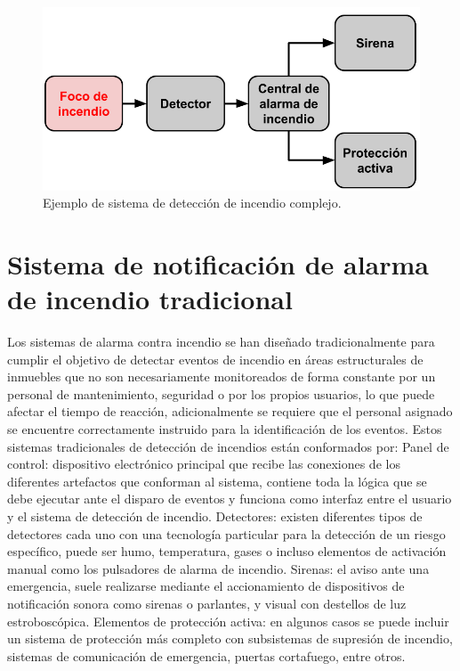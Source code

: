 \begin{figure}[h]
	\centering
	\includegraphics[scale=.4]{./Figures/Capitulo1/FIG_A1.png}
	\caption{Ejemplo de sistema de detección de incendio complejo.}
	\label{fig:figura_a1}
\end{figure}

\section{Sistema de notificación de alarma de incendio tradicional}

Los sistemas de alarma contra incendio se han diseñado tradicionalmente para cumplir el objetivo de detectar eventos de incendio en áreas estructurales de inmuebles que no son necesariamente monitoreados de forma constante por un personal de mantenimiento, seguridad o por los propios usuarios, lo que puede afectar el tiempo de reacción, adicionalmente se requiere que el personal asignado se encuentre correctamente instruido para la identificación de los eventos.
Estos sistemas tradicionales de detección de incendios están conformados por:
Panel de control: dispositivo electrónico principal que recibe las conexiones de los diferentes artefactos que conforman al sistema, contiene toda la lógica que se debe ejecutar ante el disparo de eventos y funciona como interfaz entre el usuario y el sistema de detección de incendio.
Detectores: existen diferentes tipos de detectores cada uno con una tecnología particular para la detección de un riesgo específico, puede ser humo, temperatura, gases  o incluso elementos de activación manual como los pulsadores de alarma de incendio.
Sirenas: el aviso ante una emergencia, suele realizarse mediante el accionamiento de dispositivos de notificación sonora como sirenas o parlantes, y visual con destellos de luz estroboscópica.
Elementos de protección activa: en algunos casos se puede incluir un sistema de protección más completo con subsistemas de supresión de incendio, sistemas de comunicación de emergencia, puertas cortafuego, entre otros.

